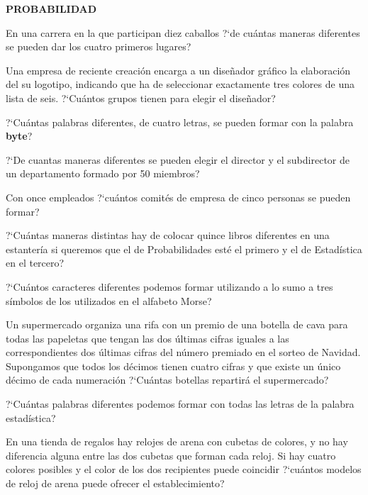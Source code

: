 \documentclass[12pt]{article}
\begin{document}
\newpage



\begin{centerline}
{{\bf PROBABILIDAD}}
\end{centerline}


\newcommand{\pr}[1]{P(#1)}




\probl  En una carrera en la que participan diez caballos ?`de
cuántas maneras diferentes se pueden dar los cuatro primeros
lugares? 

\probl  Una empresa de reciente creación encarga a un diseñador gráfico la elaboración
del su logotipo, indicando que ha de seleccionar exactamente tres colores de una lista de
seis. ?`Cuántos grupos tienen para elegir el diseñador? 

\probl  ?`Cuántas palabras diferentes, de cuatro letras, se pueden
formar con la palabra {\bf byte}? 

\probl  ?`De cuantas maneras diferentes se pueden elegir el director y el subdirector de
un departamento formado por 50 miembros? 

\probl  Con once empleados ?`cuántos comités de  empresa de cinco
personas se pueden formar? 

\probl  ?`Cuántas maneras distintas hay de colocar quince libros diferentes en una
estantería si queremos  que el  de Probabilidades esté el  primero y  el de Estadística
en el tercero? 

\probl  ?`Cuántos caracteres diferentes podemos formar utilizando a lo sumo  a tres
símbolos  de los utilizados en el alfabeto Morse? 

\probl  Un supermercado  organiza una rifa con un premio de  una botella de cava para
todas las papeletas que tengan las dos últimas cifras iguales a las correspondientes dos
últimas cifras del número premiado en el sorteo de Navidad. Supongamos que todos los
décimos tienen cuatro cifras y que existe un único décimo de cada numeración ?`Cuántas
botellas repartirá el supermercado? 

\probl  ?`Cuántas  palabras diferentes podemos formar con todas las letras de la palabra
estadística? 

\probl  En una tienda de regalos hay relojes de  arena con cubetas
de colores, y no hay diferencia alguna entre las  dos cubetas que
forman cada reloj. Si hay cuatro  colores posibles y el color de
los dos recipientes puede coincidir ?`cuántos  modelos de reloj de
arena puede ofrecer el establecimiento? 
\end{document}
